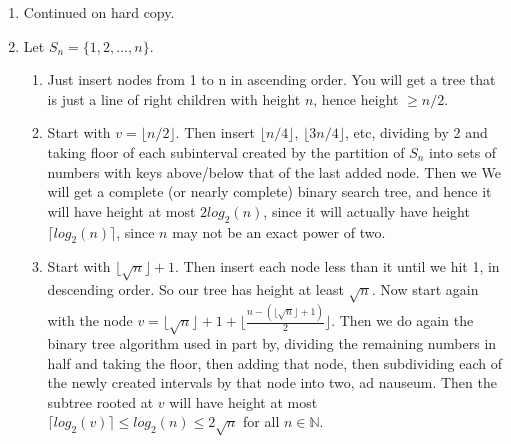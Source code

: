 \documentclass[10pt,oneside,reqno]{amsart}
\theoremstyle{plain}
\theoremstyle{definition}
\begin{document}
\begin{enumerate}[label=\arabic*.]
\item Continued on hard copy. 

\item Let $S_n = \{1,2,...,n\}$. 
\begin{enumerate}
\item Just insert nodes from 1 to n in ascending order. You will get a tree that is just a line of right children with height $n$, hence height $\geq n/2$. 

\item Start with $v = \lfloor n/2 \rfloor$. Then insert $\lfloor n/4 \rfloor$, $\lfloor 3n/4 \rfloor$, etc, dividing by 2 and taking floor of each subinterval created by the partition of $S_n$ into sets of numbers with keys above/below that of the last added node. Then we  We will get a complete (or nearly complete) binary search tree, and hence it will have height at most $2log_2(n)$, since it will actually have height $\lceil log_2(n) \rceil$, since $n$ may not be an exact power of two. 

\item Start with $\lfloor \sqrt{n} \rfloor + 1$. Then insert each node less than it until we hit 1, in descending order. So our tree has height at least $\sqrt{n}$. Now start again with the node $v = \lfloor \sqrt{n} \rfloor + 1 + \lfloor\frac{n - (\lfloor \sqrt{n} \rfloor + 1)}{2}\rfloor$. Then we do again the binary tree algorithm used in part by, dividing the remaining numbers in half and taking the floor, then adding that node, then subdividing each of the newly created intervals by that node into two, ad nauseum. Then the subtree rooted at $v$ will have height at most $\lceil log_2(v) \rceil \leq log_2(n) \leq 2\sqrt{n}$ for all $n \in \mathbb{N}$. 
\end{enumerate}






 







\end{enumerate}
\end{document}
